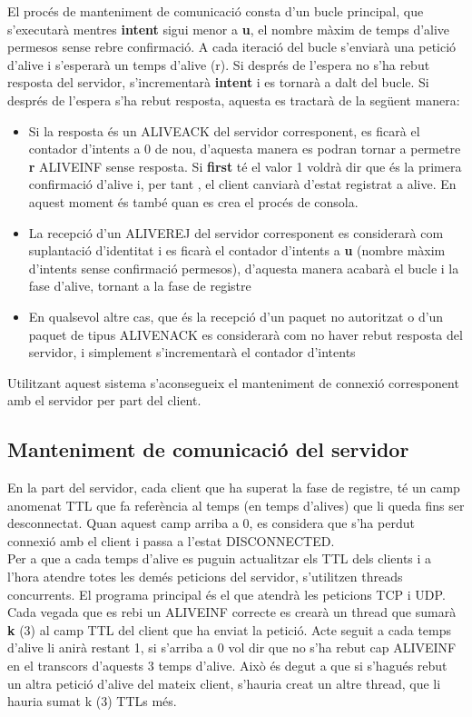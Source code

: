 \documentclass{article}
\begin{document}
El procés de manteniment de comunicació consta d'un bucle principal, 
que s'executarà mentres \textbf{intent} sigui menor a \textbf{u}, 
el nombre màxim de temps d'alive permesos sense rebre confirmació.  
A cada iteració del bucle s'enviarà una petició d'alive i s'esperarà
un temps d'alive (r). Si després de l'espera no s'ha rebut resposta
del servidor, s'incrementarà \textbf{intent} i es tornarà a dalt del
bucle. Si després de l'espera s'ha rebut resposta, aquesta es tractarà
de la següent manera:
\begin{itemize}
\item Si la resposta és un ALIVE\textunderscore ACK 
del servidor corresponent, es ficarà el contador d'intents a 0 de 
nou, d'aquesta manera es podran tornar a permetre \textbf{r} 
ALIVE\textunderscore INF sense resposta. Si \textbf{first} té el
valor 1 voldrà dir que és la primera confirmació d'alive i, per tant
, el client canviarà d'estat registrat a alive. En aquest moment és
també quan es crea el procés de consola. 
\item La recepció d'un ALIVE\textunderscore REJ del servidor corresponent
es considerarà com suplantació d'identitat i es ficarà el contador 
d'intents a \textbf{u} (nombre màxim d'intents sense confirmació 
permesos), d'aquesta manera acabarà el bucle i la fase d'alive, tornant 
a la fase de registre
\item En qualsevol altre cas, que és la recepció d'un paquet no autoritzat
o d'un paquet de tipus ALIVE\textunderscore NACK es considerarà com no haver 
rebut resposta del servidor, i simplement s'incrementarà el contador d'intents
\end{itemize}
Utilitzant aquest sistema s'aconsegueix el manteniment de connexió  corresponent 
amb el servidor per part del client.
 

\subsection{Manteniment de comunicació del servidor}

En la part del servidor, cada client que ha superat la fase de registre, té un camp
anomenat TTL que fa referència al temps (en temps d'alives) que li queda fins ser 
desconnectat. Quan aquest camp arriba a 0, es considera que s'ha perdut connexió amb
el client i passa a l'estat DISCONNECTED.\\

Per a que a cada temps d'alive es puguin actualitzar els TTL dels clients i a l'hora
atendre totes les demés peticions del servidor, s'utilitzen threads concurrents. El
programa principal és el que atendrà les peticions TCP i UDP. Cada vegada que es rebi
un ALIVE\textunderscore INF correcte es crearà un thread que sumarà \textbf{k} (3) al
camp TTL del client que ha enviat la petició. Acte seguit a cada temps d'alive li anirà
restant 1, si s'arriba a 0 vol dir que no s'ha rebut cap ALIVE\textunderscore INF en el
transcors d'aquests 3 temps d'alive. Això és degut a que si s'hagués rebut un altra 
petició d'alive del mateix client, s'hauria creat un altre thread, que li hauria 
sumat k (3) TTLs més.\\
\end{document}
